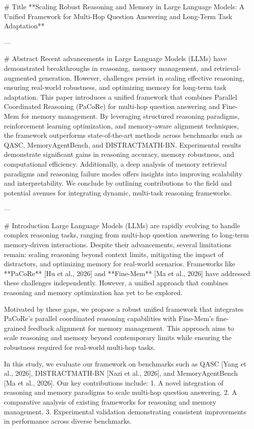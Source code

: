 # Title  
**Scaling Robust Reasoning and Memory in Large Language Models: A Unified Framework for Multi-Hop Question Answering and Long-Term Task Adaptation**

---

# Abstract  
Recent advancements in Large Language Models (LLMs) have demonstrated breakthroughs in reasoning, memory management, and retrieval-augmented generation. However, challenges persist in scaling effective reasoning, ensuring real-world robustness, and optimizing memory for long-term task adaptation. This paper introduces a unified framework that combines Parallel Coordinated Reasoning (PaCoRe) for multi-hop question answering and Fine-Mem for memory management. By leveraging structured reasoning paradigms, reinforcement learning optimization, and memory-aware alignment techniques, the framework outperforms state-of-the-art methods across benchmarks such as QASC, MemoryAgentBench, and DISTRACTMATH-BN. Experimental results demonstrate significant gains in reasoning accuracy, memory robustness, and computational efficiency. Additionally, a deep analysis of memory retrieval paradigms and reasoning failure modes offers insights into improving scalability and interpretability. We conclude by outlining contributions to the field and potential avenues for integrating dynamic, multi-task reasoning frameworks.

---

# Introduction  
Large Language Models (LLMs) are rapidly evolving to handle complex reasoning tasks, ranging from multi-hop question answering to long-term memory-driven interactions. Despite their advancements, several limitations remain: scaling reasoning beyond context limits, mitigating the impact of distractors, and optimizing memory for real-world scenarios. Frameworks like **PaCoRe** [Hu et al., 2026] and **Fine-Mem** [Ma et al., 2026] have addressed these challenges independently. However, a unified approach that combines reasoning and memory optimization has yet to be explored.  

Motivated by these gaps, we propose a robust unified framework that integrates PaCoRe's parallel coordinated reasoning capabilities with Fine-Mem's fine-grained feedback alignment for memory management. This approach aims to scale reasoning and memory beyond contemporary limits while ensuring the robustness required for real-world multi-hop tasks.  

In this study, we evaluate our framework on benchmarks such as QASC [Yang et al., 2026], DISTRACTMATH-BN [Nazi et al., 2026], and MemoryAgentBench [Ma et al., 2026]. Our key contributions include:  
1. A novel integration of reasoning and memory paradigms to scale multi-hop question answering.  
2. A comparative analysis of existing frameworks for reasoning and memory management.  
3. Experimental validation demonstrating consistent improvements in performance across diverse benchmarks.

